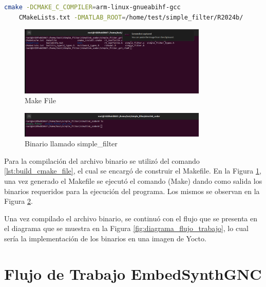 \begin{lstlisting}[language=bash, caption={Compilacion del programa, Linux}, label=lst:build_cmake_file]
    cmake -DCMAKE_C_COMPILER=arm-linux-gnueabihf-gcc 
    CMakeLists.txt -DMATLAB_ROOT=/home/test/simple_filter/R2024b/
\end{lstlisting}

\begin{figure}[h!]
    \centering
    \includegraphics[width=0.8\textwidth]{fig/especifico_2/M2MT/paso_a_paso_mtmt/cmake_file.pdf}
    \caption{Make File}
    \label{fig:make_file}
\end{figure}


\begin{figure}[h!]
    \centering
    \includegraphics[width=0.8\textwidth]{fig/especifico_2/M2MT/paso_a_paso_mtmt/binario_compilado.pdf}
    \caption{Binario llamado simple\_filter}
    \label{fig:binario_compilado}
\end{figure}

Para la compilación del archivo binario se utilizó del comando \ref{lst:build_cmake_file}, el cual se encargó de construir el Makefile. En la Figura \ref{fig:make_file}, una vez generado el Makefile se ejecutó el comando (Make) dando como salida los binarios requeridos para la ejecución del programa. Los mismos se observan en la Figura \ref{fig:binario_compilado}.

Una vez compilado el archivo binario, se continuó con el flujo que se presenta en el diagrama que se muestra en la Figura \ref{fig:diagrama_flujo_trabajo}, lo cual sería la implementación de los binarios en una imagen de Yocto.
\newpage

\section{Flujo de Trabajo EmbedSynthGNC}

